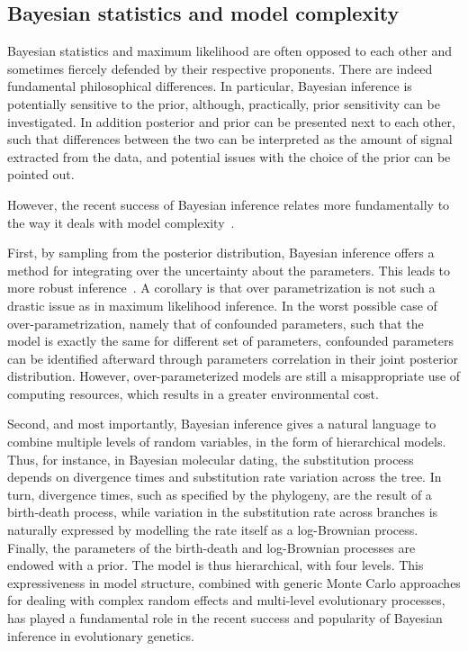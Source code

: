 \subsection{Bayesian statistics and model complexity}
\label{subsec:bayesian-statistics-and-maximum-likelihood}
Bayesian statistics and maximum \gls{likelihood} are often opposed to each other and sometimes fiercely defended by their respective proponents.
There are indeed fundamental philosophical differences.
In particular, Bayesian inference is potentially sensitive to the \gls{prior}, although, practically, \gls{prior} sensitivity can be investigated.
In addition \gls{posterior} and \gls{prior} can be presented next to each other, such that differences between the two can be interpreted as the amount of signal extracted from the data, and potential issues with the choice of the \gls{prior} can be pointed out.

However, the recent success of Bayesian inference relates more fundamentally to the way it deals with model complexity~\citep{Huelsenbeck2000a,Lartillot2020}.

First, by sampling from the \gls{posterior} distribution, Bayesian inference offers a method for integrating over the uncertainty about the parameters.
This leads to more robust inference~\citep{Huelsenbeck2000a}.
A corollary is that over parametrization is not such a drastic issue as in maximum \gls{likelihood} inference.
In the worst possible case of over-parametrization, namely that of confounded parameters, such that the model is exactly the same for different set of parameters, confounded parameters can be identified afterward through parameters correlation in their joint \gls{posterior} distribution.
However, over-parameterized models are still a misappropriate use of computing resources, which results in a greater environmental cost.

Second, and most importantly, Bayesian inference gives a natural language to combine multiple levels of random variables, in the form of hierarchical models.
Thus, for instance, in Bayesian molecular dating, the \gls{substitution} process depends on divergence times and \gls{substitution} rate variation across the tree.
In turn, divergence times, such as specified by the phylogeny, are the result of a birth-death process, while variation in the \gls{substitution} rate across branches is naturally expressed by modelling the rate itself as a log-Brownian process.
Finally, the parameters of the birth-death and log-Brownian processes are endowed with a \gls{prior}.
The model is thus hierarchical, with four levels.
This expressiveness in model structure, combined with generic Monte Carlo approaches for dealing with complex random effects and multi-level evolutionary processes, has played a fundamental role in the recent success and popularity of Bayesian inference in evolutionary genetics.

